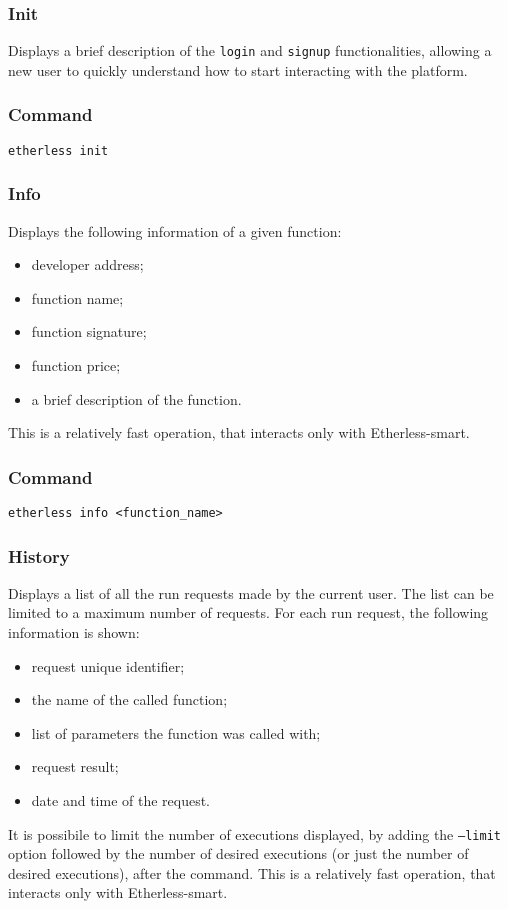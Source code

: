 	\subsubsection{Init}
	Displays a brief description of the \texttt{login} and \texttt{signup} functionalities, allowing a new user to quickly understand how to start interacting with the platform.
	\subsubsection*{Command}
	\texttt{etherless init}
	\subsubsection{Info}
	Displays the following information of a given function:
	\begin{itemize}
		\item developer address;
		\item function name;
		\item function signature;
		\item function price;
		\item a brief description of the function.
	\end{itemize}
	This is a relatively fast operation, that interacts only with Etherless-smart.
	\subsubsection*{Command}
	\texttt{etherless info <function\_name>}
	\subsubsection{History}
	Displays a list of all the run requests made by the current user. The list can be limited to a maximum number of requests. For each run request, the following information is shown:
	\begin{itemize}
		\item request unique identifier;
		\item the name of the called function;
		\item list of parameters the function was called with;
		\item request result;
		\item date and time of the request.
	\end{itemize}
	It is possibile to limit the number of executions displayed, by adding the \texttt{---limit} option followed by the number of desired executions (or just the number of desired executions), after the command.
	This is a relatively fast operation, that interacts only with Etherless-smart.
